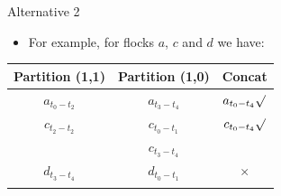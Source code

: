 \documentclass{beamer}
\begin{document}
\begin{frame}{Alternative 2}
    \begin{itemize}
        \item For example, for flocks $a$, $c$ and $d$ we have:  
    \end{itemize}
    \centering
    \begin{tabular}{ c c c }
        \hline
        Partition (1,1) & Partition (1,0)  & Concat \\
        \hline
        $a_{t_0-t_2}$   & $a_{t_3-t_4}$     & $a_{t_0-t_4}\surd$    \\
        \arrayrulecolor{lightgray}\hline
        $c_{t_2-t_2}$   & $c_{t_0-t_1}$     & $c_{t_0-t_4}\surd$    \\
                        & $c_{t_3-t_4}$     &                       \\
        \hline
        $d_{t_3-t_4}$   & $d_{t_0-t_1}$     & $\times$              \\
        \arrayrulecolor{black}\hline
    \end{tabular}
\end{frame}
\end{document}
